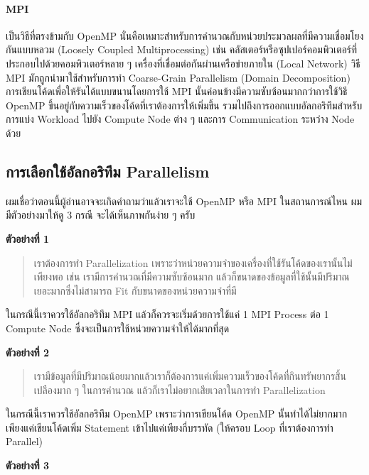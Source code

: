 \paragraph{MPI}
เป็นวิธีที่ตรงข้ามกับ OpenMP นั่นคือเหมาะสำหรับการคำนวณกับหน่วยประมวลผลที่มีความเชื่อมโยงกันแบบหลวม (Loosely Coupled Multiprocessing)
เช่น คลัสเตอร์หรือซุปเปอร์คอมพิวเตอร์ที่ประกอบไปด้วยคอมพิวเตอร์หลาย ๆ เครื่องที่เชื่อมต่อกันผ่านเครือข่ายภายใน (Local Network) วิธี MPI
มักถูกนำมาใช้สำหรับการทำ Coarse-Grain Parallelism (Domain Decomposition) การเขียนโค้ดเพื่อให้รันได้แบบขนานโดยการใช้ MPI
นั้นค่อนข้างมีความซับซ้อนมากกว่าการใช้วิธี OpenMP ขึ้นอยู่กับความเร็วของโค้ดที่เราต้องการให้เพิ่มขึ้น รวมไปถึงการออกแบบอัลกอริทึมสำหรับการแบ่ง
Workload ไปยัง Compute Node ต่าง ๆ และการ Communication ระหว่าง Node ด้วย

\subsection{การเลือกใช้อัลกอริทึม Parallelism}

ผมเชื่อว่าตอนนี้ผู้อ่านอาจจะเกิดคำถามว่าแล้วเราจะใช้ OpenMP หรือ MPI ในสถานการณ์ไหน ผมมีตัวอย่างมาให้ดู 3 กรณี จะได้เห็นภาพกันง่าย ๆ ครับ

\noindent \textbf{ตัวอย่างที่ 1}

\begin{quote}
  \color{gray}
  เราต้องการทำ Parallelization เพราะว่าหน่วยความจำของเครื่องที่ใช้รันโค้ดของเรานั้นไม่เพียงพอ เช่น เรามีการคำนวณที่มีความซับซ้อนมาก
  แล้วก็ขนาดของข้อมูลที่ใช้นั้นมีปริมาณเยอะมากซึ่งไม่สามารถ Fit กับขนาดของหน่วยความจำที่มี
\end{quote}

ในกรณีนี้เราควรใช้อัลกอริทึม MPI แล้วก็ควรจะเริ่มด้วยการใช้แค่ 1 MPI Process ต่อ 1 Compute Node ซึ่งจะเป็นการใช้หน่วยความจำให้ได้มากที่สุด

\noindent \textbf{ตัวอย่างที่ 2}

\begin{quote}
  \color{gray}
  เรามีข้อมูลที่มีปริมาณน้อยมากแล้วเราก็ต้องการแค่เพิ่มความเร็วของโค้ดที่กินทรัพยากรสิ้นเปลืองมาก ๆ ในการคำนวณ แล้วก็เราไม่อยากเสียเวลาในการทำ
  Parallelization
\end{quote}

ในกรณีนี้เราควรใช้อัลกอริทึม OpenMP เพราะว่าการเขียนโค้ด OpenMP นั้นทำได้ไม่ยากมาก เพียงแค่เขียนโค้ดเพิ่ม Statement เข้าไปแค่เพียงกี่บรรทัด
(ให้ครอบ Loop ที่เราต้องการทำ Parallel)

\noindent \textbf{ตัวอย่างที่ 3}

